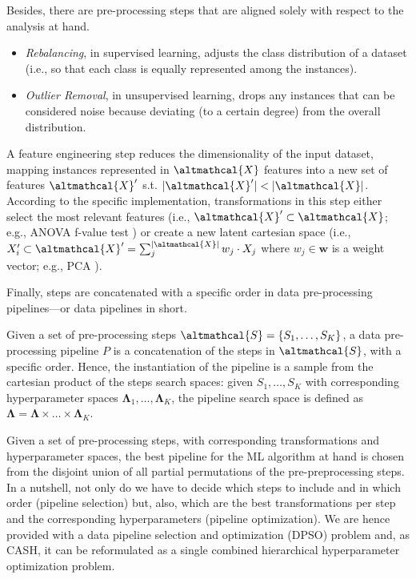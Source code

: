 Besides, there are pre-processing steps that are aligned solely with respect to the analysis at hand.
\begin{itemize}
    \item \textit{Rebalancing}, in supervised learning, adjusts the class distribution of a dataset (i.e., so that each class is equally represented among the instances).
    \item \textit{Outlier Removal}, in unsupervised learning, drops any instances that can be considered noise because deviating (to a certain degree) from the overall distribution.
\end{itemize}

\begin{example}
    A feature engineering step reduces the dimensionality of the input dataset, mapping instances represented in $\altmathcal{X}$ features into a new set of features  $\altmathcal{X}'$ s.t.  $|\altmathcal{X}'| < |\altmathcal{X}|$.
    According to the specific implementation, transformations in this step either select the most relevant features (i.e., $\altmathcal{X}' \subset \altmathcal{X}$; e.g., ANOVA f-value test \cite{}) or create a new latent cartesian space (i.e., $X'_{i} \subset \altmathcal{X}' = \sum_{j}^{|\altmathcal{X}|} w_j \cdot X_j$ where $w_j \in \pmb{w}$ is a weight vector; e.g., PCA \cite{}).
\end{example}

Finally, steps are concatenated with a specific order in data pre-processing pipelines---or data pipelines in short.

\begin{definition}
    Given a set of pre-processing steps $\altmathcal{S} = \{S_1,\dots, S_{K}\}$, a data pre-processing pipeline $P$ is a concatenation of the steps in $\altmathcal{S}$, with a specific order.
    Hence, the instantiation of the pipeline is a sample from the cartesian product of the steps search spaces: given $S_1, \dots, S_K$ with corresponding hyperparameter spaces $\pmb{\Lambda}_1, \dots, \pmb{\Lambda}_K$, the pipeline search space is defined as  $\pmb{\Lambda}  = \pmb{\Lambda} \times \dots \times \pmb{\Lambda}_K$.
\end{definition}

Given a set of pre-processing steps, with corresponding transformations and hyperparameter spaces, the best pipeline for the ML algorithm at hand is chosen from the disjoint union of all partial permutations of the pre-preprocessing steps.
In a nutshell, not only do we have to decide which steps to include and in which order (pipeline selection) but, also, which are the best transformations per step and the corresponding hyperparameters (pipeline optimization).
We are hence provided with a data pipeline selection and optimization (DPSO) problem \cite{} and, as CASH, it can be reformulated as a single combined hierarchical hyperparameter optimization problem.

